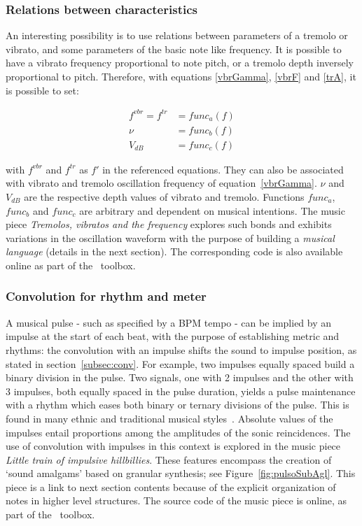 \subsubsection{Relations between characteristics}
An interesting possibility is to use relations between parameters of
a tremolo or vibrato, and some parameters of the basic note like frequency. It is possible to have a vibrato frequency proportional
to note pitch, or a tremolo depth inversely proportional to
pitch. Therefore, with equations \ref{vbrGamma}, \ref{vbrF} and \ref{trA}, it is possible to set:

\begin{equation}\label{eq:vinculos}
\begin{split}
f^{vbr} = f^{tr} & = func_a(f) \\
\nu & = func_b(f) \\
V_{dB} & = func_c(f)
\end{split}
\end{equation}

\noindent with $f^{vbr}$ and $f^{tr}$ as $f'$ in the referenced equations. They can also be associated with vibrato and tremolo oscillation frequency of equation~\ref{vbrGamma}. 
 $\nu$ and $V_{dB}$ are the respective depth values of vibrato and
tremolo. Functions $func_a$, $func_b$ and $func_c$ are arbitrary and dependent on musical intentions. The music piece \emph{Tremolos, vibratos and the
frequency} explores such bonds and exhibits variations in the oscillation waveform with the purpose of building a \emph{musical
language} (details in the next section). The corresponding code is also available online as part of the \massa\ toolbox.

\subsubsection{Convolution for rhythm and meter}
A musical pulse - such as specified by a BPM
tempo - can be implied by an impulse at the start of each beat, with the purpose of establishing metric and rhythms: the convolution with an impulse shifts the sound to impulse position, as stated in section~\ref{subsec:conv}. For example, two impulses equally spaced build a binary division in the
pulse. Two signals, one with 2 impulses and the other with 3 impulses, both equally spaced in the pulse duration, yields a pulse
maintenance with a rhythm which eases both binary or ternary
divisions of the pulse. This is found in many ethnic and traditional musical styles~\cite{Gramani}. Absolute values of the impulses entail
proportions among the amplitudes of the sonic reincidences. The use of convolution with impulses in this context is explored in the music piece \emph{Little train of impulsive hillbillies}.
These features encompass
the creation of `sound amalgams' based on granular synthesis; see Figure~\ref{fig:pulsoSubAgl}. This piece is a link to next section contents because of the explicit organization of notes in higher level structures. The source code of the music piece is online, as part of the \massa\ toolbox\cite{MASSA}.


